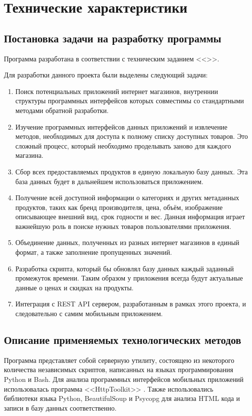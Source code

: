 \documentclass[a4paper,12pt]{article}
\begin{document}
  \newpage
  \section{Технические характеристики}
  \subsection{Постановка задачи на разработку программы}
  Программа разработана в соответствии с техническим заданием <<\CRTname>>.

  Для разработки данного проекта были выделены следующий задачи:
  \begin{enumerate}
    \item Поиск потенциальных приложений интернет магазинов, внутреннии структуры программных интерфейсов которых совместимы со стандартными методами обратной разработки.
    \item Изучение программных интерфейсов данных приложений и извлечение методов, необходимых для доступа к полному списку доступных товаров. Это сложный процесс, который необходимо проделывать заново для каждого магазина.
    \item Сбор всех предоставляемых продуктов в единую локальную базу данных. Эта база данных будет в дальнейшем использоваться приложением.
    \item Получение всей доступной информации о категориях и других метаданных продуктов, таких как бренд производителя, цена, объём, изображение описывающее внешний вид, срок годности и вес. Данная информация играет важнейшую роль в поиске нужных товаров пользователями приложения.
    \item Объединение данных, полученных из разных интернет магазинов в единый формат, а также заполнение пропущенных значений.
    \item Разработка скрипта, который бы обновлял базу данных каждый заданный промежуток времени. Таким образом у приложения всегда будут актуальные данные о ценах и скидках на продукты.
    \item Интеграция с REST API сервером, разработанным в рамках этого проекта, и следовательно с самим мобильным приложением.
  \end{enumerate}

  \subsection{Описание применяемых технологических методов}
  Программа представляет собой серверную утилиту, состоящею из некоторого количества независимых скриптов,
  написанных на языках программирования Python \cite{python} и Bash.
  Для анализа программных интерфейсов мобильных приложений использовалась программа <<HttpToolkit>> \cite{httptoolkit}.
  Также использовались библиотеки языка Python, BeautifulSoup \cite{beautifulsoup} и Psycopg \cite{psycopg2}
  для анализа HTML кода и записи в базу данных соответственно.
\end{document}
